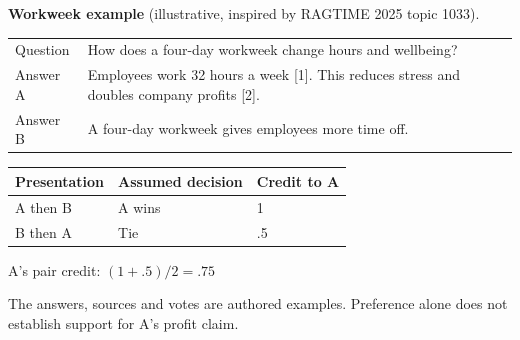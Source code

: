 \documentclass[11pt,letterpaper]{article}
\begin{document}
\textbf{Workweek example} (illustrative, inspired by RAGTIME 2025 topic 1033).
\begin{center}
\begin{tabularx}{\linewidth}{@{}lY@{}}\toprule
Question & How does a four-day workweek change hours and wellbeing?\\
Answer A & Employees work 32 hours a week [1]. This reduces stress and doubles company profits [2].\\
Answer B & A four-day workweek gives employees more time off.\\\bottomrule
\end{tabularx}
\par\vspace{9pt}
\begin{tabular}{lll}\toprule
Presentation & Assumed decision & Credit to A\\\midrule
A then B & A wins & 1\\
B then A & Tie & .5\\\bottomrule
\end{tabular}
\quad A's pair credit: $(1+.5)/2=\mathbf{.75}$
\end{center}
The answers, sources and votes are authored examples. Preference alone does not establish support for A's profit claim.

\end{document}
